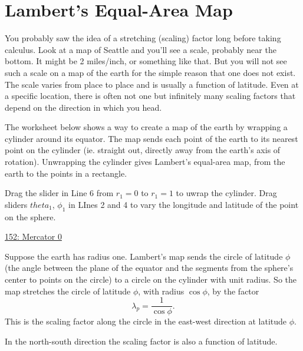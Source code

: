 \documentclass{ximera}
\begin{document}
\section{Lambert's Equal-Area Map}


You probably saw the idea of a stretching (scaling) factor long before taking calculus. Look at a map of Seattle and you'll see a scale, probably near the bottom. It might be 2 miles/inch, or something like that. But you will not see such a scale on a map of the earth for the simple reason that one does not exist. The scale varies from place to place and is usually a function of latitude. Even at a specific location, there is often not one but infinitely many scaling factors that depend on the direction in which you head. 

The worksheet below shows a way to create a map of the earth by wrapping a cylinder around its equator. The map sends each point of the earth to its nearest point on the cylinder (ie. straight out, directly away from the earth's axis of rotation). Unwrapping the cylinder gives Lambert's equal-area map, from the earth to the points in a rectangle.

\begin{exploration}  \label{EXPDkjkeFERerRd8}
Drag the slider in Line 6  from $r_1=0$ to $r_1=1$ to uwrap the cylinder. Drag sliders $theta_1$, $\phi_1$ in LInes 2 and 4 to vary the longitude and latitude of the point on the sphere.
\begin{onlineOnly}
    \begin{center}
\end{center}
\end{onlineOnly}

\href{https://www.desmos.com/3d/ehyvvttdeo}{152: Mercator 0}

\end{exploration}

Suppose the earth has radius one. Lambert's map sends the circle of latitude $\phi$ (the angle between the plane of the equator and the segments from the sphere's center to points on the circle) to a circle on the cylinder with unit radius. So the map stretches the circle of latitude $\phi$, with radius $\cos\phi$, by the factor
\[
 \lambda_p = \frac{1}{\cos\phi}.
\]
This is the scaling factor along the circle in the east-west direction at latitude $\phi$.

In the north-south direction the scaling factor is also a function of latitude.
\end{document}

